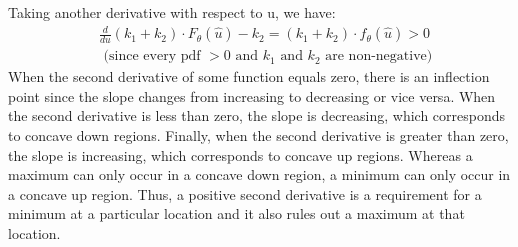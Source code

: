 Taking another derivative with respect to u, we have:
\begin{align*}
    & \frac{d}{du}(k_1+k_2)\cdot F_\theta(\hat{u}) - k_2 = (k_1+k_2)\cdot f_\theta(\hat{u}) > 0\\
    & \text{ (since every pdf $>0$ and $k_1$ and $k_2$ are non-negative)}
\end{align*}
When the second derivative of some function equals zero, there is an inflection point since the slope changes from increasing to decreasing or vice versa. When the second derivative is less than zero, the slope is decreasing, which corresponds to concave down regions. Finally, when the second derivative is greater than zero, the slope is increasing, which corresponds to concave up regions. Whereas a maximum can only occur in a concave down region, a minimum can only occur in a concave up region. Thus, a positive second derivative is a requirement for a minimum at a particular location and it also rules out a maximum at that location.